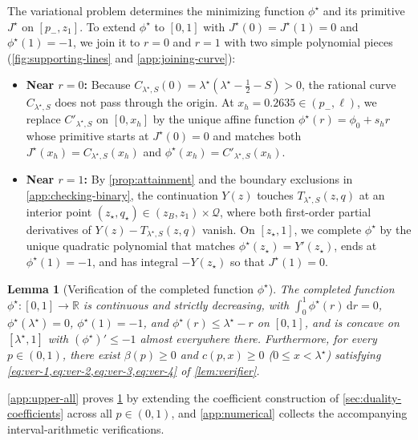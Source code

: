 \documentclass[11pt]{article}
\numberwithin{equation}{section}
\theoremstyle{plain}
\newtheorem{lemma}[theorem]{Lemma}
\theoremstyle{definition}
\newcommand{\R}{\mathbb{R}}
\newcommand{\1}{\mathbf{1}}
\newcommand{\calQ}{\mathcal{Q}}
\begin{document}
The variational problem determines the minimizing function $\phi^\star$ and its primitive $J^\star$ on $[p_-, z_1]$. To extend $\phi^\star$ to $[0, 1]$ with $J^\star(0) = J^\star(1) = 0$ and $\phi^\star(1) = -1$, we join it to $r = 0$ and $r = 1$ with two simple polynomial pieces (\cref{fig:supporting-lines} and \cref{app:joining-curve}):
\begin{itemize}
  \item \textbf{Near $r = 0$:} Because $C_{\lambda^\star, S}(0) = \lambda^\star(\lambda^\star - \frac{1}{2} - S) > 0$, the rational curve $C_{\lambda^\star, S}$ does not pass through the origin. At $x_h = 0.2635 \in (p_-, \ell)$, we replace $C'_{\lambda^\star, S}$ on $[0, x_h]$ by the unique affine function $\phi^\star(r) = \phi_0 + s_h r$ whose primitive starts at $J^\star(0) = 0$ and matches both $J^\star(x_h) = C_{\lambda^\star, S}(x_h)$ and $\phi^\star(x_h) = C'_{\lambda^\star, S}(x_h)$.
  \item \textbf{Near $r = 1$:} By \cref{prop:attainment} and the boundary exclusions in \cref{app:checking-binary}, the continuation $Y(z)$ touches $T_{\lambda^\star, S}(z, q)$ at an interior point $(z_\star, q_\star) \in (z_B, z_1) \times \calQ$, where both first-order partial derivatives of $Y(z) - T_{\lambda^\star, S}(z, q)$ vanish. On $[z_\star, 1]$, we complete $\phi^\star$ by the unique quadratic polynomial that matches $\phi^\star(z_\star) = Y'(z_\star)$, ends at $\phi^\star(1) = -1$, and has integral $-Y(z_\star)$ so that $J^\star(1) = 0$.
\end{itemize}

\begin{lemma}[Verification of the completed function $\phi^\star$]
\label{lem:completed-score}
The completed function $\phi^\star \colon [0, 1] \to \R$ is continuous and strictly decreasing, with $\int_0^1 \phi^\star(r)\,\mathrm{d}r = 0$, $\phi^\star(\lambda^\star) = 0$, $\phi^\star(1) = -1$, and $\phi^\star(r) \le \lambda^\star - r$ on $[0, 1]$, and is concave on $[\lambda^\star, 1]$ with $(\phi^\star)' \le -1$ almost everywhere there. Furthermore, for every $p \in (0, 1)$, there exist $\beta(p) \ge 0$ and $c(p, x) \ge 0$ ($0 \le x < \lambda^\star$) satisfying \cref{eq:ver-1,eq:ver-2,eq:ver-3,eq:ver-4} of \cref{lem:verifier}.
\end{lemma}

\cref{app:upper-all} proves \cref{lem:completed-score} by extending the coefficient construction of \cref{sec:duality-coefficients} across all $p \in (0, 1)$, and \cref{app:numerical} collects the accompanying interval-arithmetic verifications.
\end{document}
